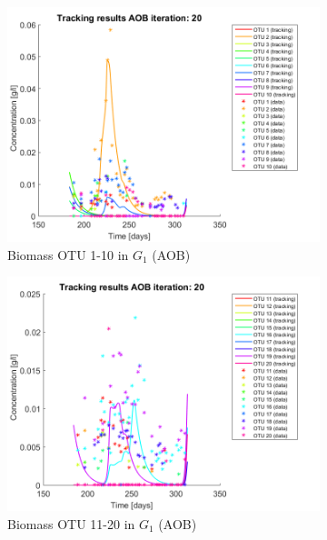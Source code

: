 \documentclass[processes,article,submit,moreauthors,pdftex]{Definitions/mdpi}
\begin{document}
\begin{figure}[h]
	\centering
	\begin{subfigure}{0.45 \textwidth}
		\includegraphics[width =\textwidth]{Application//200407_iter_20_AOB_plot_1}
		\caption{Biomass OTU 1-10 in $G_1$ (AOB) }
	\end{subfigure}
	\begin{subfigure}{0.45 \textwidth}
		\includegraphics[width =\textwidth]{Application//200407_iter_20_AOB_plot_2}
		\caption{Biomass OTU 11-20 in $G_1$ (AOB) }
	\end{subfigure}
	\begin{subfigure}{0.45 \textwidth}

\end{subfigure}
\end{figure}
\end{document}
